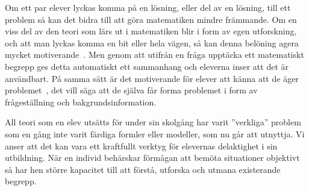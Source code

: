 
\label{sec:delaktighet}
\textcolor{WildStrawberry}{
    Om ett par elever lyckas komma på en lösning, eller del av en lösning, till ett problem så kan det bidra till att göra matematiken mindre främmande. Om en viss del av den teori som lärs ut i matematiken blir i form av egen utforskning, och att man lyckas komma en bit eller hela vägen, så kan denna belöning agera mycket motiverande~\cite{TheElephant}.} \textcolor{lila}{Men genom att utifrån en fråga upptäcka ett matematiskt begrepp ges detta automatiskt ett sammanhang och eleverna inser att det är användbart. På samma sätt är det motiverande för elever att känna att de äger problemet~\cite{TheElephant}, det vill säga att de själva får forma problemet i form av frågeställning och bakgrundsinformation. }
    
\textcolor{WildStrawberry}{
    All teori som en elev utsätts för under sin skolgång har varit ''verkliga'' problem som en gång inte varit färdiga formler eller modeller, som nu går att utnyttja. Vi anser att det kan vara ett kraftfullt verktyg för elevernas delaktighet i sin utbildning. När en individ behärskar förmågan att bemöta situationer objektivt så har hen större kapacitet till att förstå, utforska och utmana existerande begrepp. }
    
        
        
% 